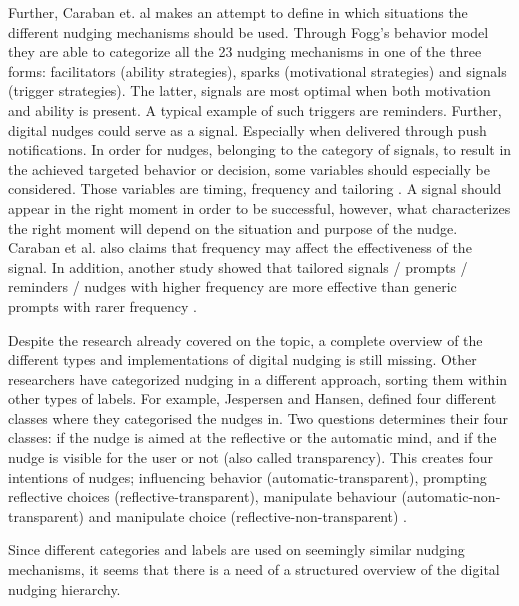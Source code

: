 Further, Caraban et. al \cite{caraban_23_2019} makes an attempt to define in which situations the different nudging mechanisms should be used. Through Fogg's behavior model they are able to categorize all the 23 nudging mechanisms in one of the three forms: facilitators (ability strategies), sparks (motivational strategies) and signals (trigger strategies). 
The latter, signals are most optimal when both motivation and ability is present. A typical example of such triggers are reminders. Further, digital nudges could serve as a signal. Especially when delivered through push notifications. In order for nudges, belonging to the category of signals, to result in the achieved targeted behavior or decision, some variables should especially be considered. Those variables are timing, frequency and tailoring \cite{caraban_23_2019}. A signal should appear in the right moment in order to be successful, however, what characterizes the right moment will depend on the situation and purpose of the nudge. Caraban et al. also claims that frequency may affect the effectiveness of the signal. In addition, another study showed that tailored signals / prompts / reminders / nudges with higher frequency are more effective than generic prompts with rarer frequency \cite{fry_periodic_2009}. 

Despite the research already covered on the topic, a complete overview of the different types and implementations of digital nudging is still missing. Other researchers have categorized nudging in a different approach, sorting them within other types of labels. For example, Jespersen and Hansen\cite{hansen_nudge_2013}, defined four different classes where they categorised the nudges in. %
Two questions determines their four classes: if the nudge is aimed at the reflective or the automatic mind, and if the nudge is visible for the user or not (also called transparency). This creates four intentions of nudges; influencing behavior (automatic-transparent), prompting reflective choices (reflective-transparent), manipulate behaviour (automatic-non-transparent) and manipulate choice (reflective-non-transparent) \cite{hansen_nudge_2013}.

Since different categories and labels are used on seemingly similar nudging mechanisms, it seems that there is a need of a structured overview of the digital nudging hierarchy. 

